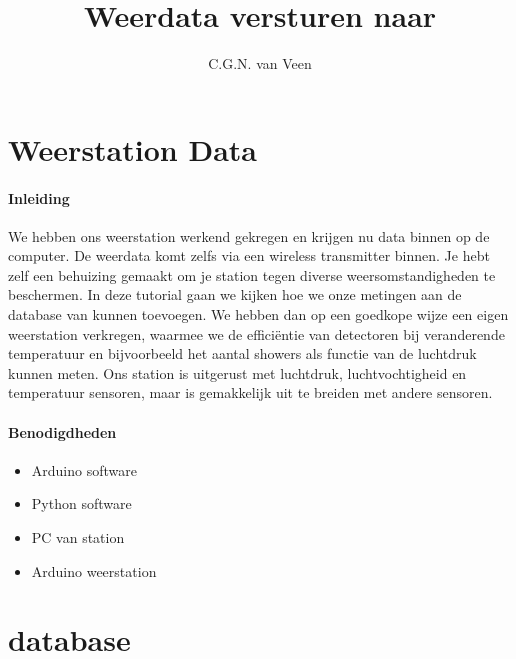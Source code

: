 

\makeatletter
\global\let\tikz@ensure@dollar@catcode=\relax
\makeatother

\title{Weerdata versturen naar \hisparc}
\author{C.G.N. van Veen}



\maketitle

\section{Weerstation Data}

\paragraph{Inleiding} We hebben ons weerstation werkend gekregen en krijgen nu
data binnen op de computer. De weerdata komt zelfs via een wireless
transmitter binnen. Je hebt zelf een behuizing gemaakt om je station tegen
diverse weersomstandigheden te beschermen. In deze tutorial gaan we kijken hoe
we onze metingen aan de database van \hisparc kunnen toevoegen. We hebben dan
op een goedkope wijze een eigen weerstation verkregen, waarmee we de
efficiëntie van detectoren bij veranderende temperatuur en bijvoorbeeld het
aantal showers als functie van de luchtdruk kunnen meten. Ons station is
uitgerust met luchtdruk, luchtvochtigheid en temperatuur sensoren, maar is
gemakkelijk uit te breiden met andere sensoren.

\paragraph{Benodigdheden}

\begin{itemize}
    \item Arduino software
    \item Python software
    \item PC van \hisparc station
    \item Arduino weerstation
\end{itemize}


\section{\hisparc database}

